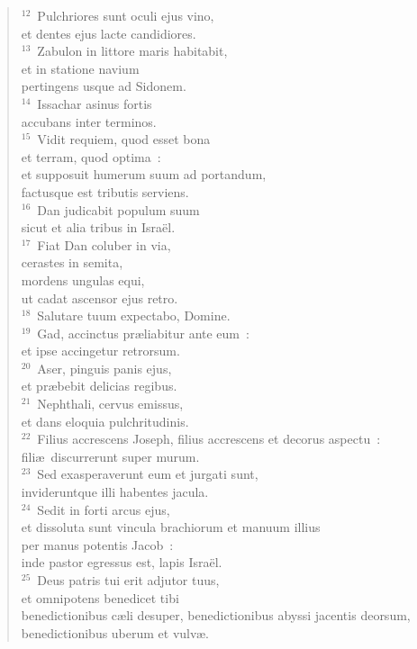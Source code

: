 \begin{verse}
${}^{12}$~Pulchriores sunt oculi ejus vino,\\ et dentes ejus lacte candidiores.\\
${}^{13}$~Zabulon in littore maris habitabit,\\ et in statione navium\\ pertingens usque ad Sidonem.\\
${}^{14}$~Issachar asinus fortis\\ accubans inter terminos.\\
${}^{15}$~Vidit requiem, quod esset bona\\ et terram, quod optima~:\\ et supposuit humerum suum ad portandum,\\ factusque est tributis serviens.\\
${}^{16}$~Dan judicabit populum suum\\ sicut et alia tribus in Isra\"el.\\
${}^{17}$~Fiat Dan coluber in via,\\ cerastes in semita,\\ mordens ungulas equi,\\ ut cadat ascensor ejus retro.\\
${}^{18}$~Salutare tuum expectabo, Domine.\\
${}^{19}$~Gad, accinctus pr\ae liabitur ante eum~:\\ et ipse accingetur retrorsum.\\
${}^{20}$~Aser, pinguis panis ejus,\\ et pr\ae bebit delicias regibus.\\
${}^{21}$~Nephthali, cervus emissus,\\ et dans eloquia pulchritudinis.\\
${}^{22}$~Filius accrescens Joseph, filius accrescens et decorus aspectu~:\\ fili\ae\ discurrerunt super murum.\\
${}^{23}$~Sed exasperaverunt eum et jurgati sunt,\\ invideruntque illi habentes jacula.\\
${}^{24}$~Sedit in forti arcus ejus,\\ et dissoluta sunt vincula brachiorum et manuum illius\\ per manus potentis Jacob~:\\ inde pastor egressus est, lapis Isra\"el.\\
${}^{25}$~Deus patris tui erit adjutor tuus,\\ et omnipotens benedicet tibi\\ benedictionibus c\ae li desuper, benedictionibus abyssi jacentis deorsum,\\ benedictionibus uberum et vulv\ae .\\

\end{verse}
